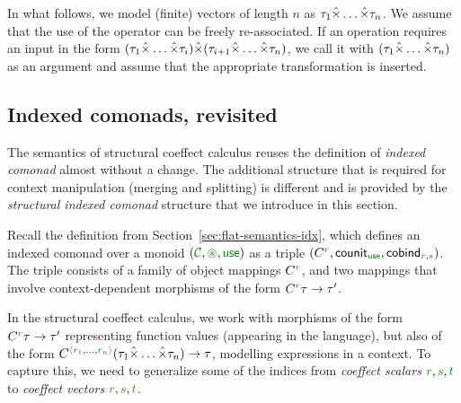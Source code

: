 In what follows, we model (finite) vectors of length $n$ as $\tau_1 \hat{\times} \ldots \hat{\times} \tau_n$.
We assume that the use of the operator can be freely re-associated. If an operation requires an 
input in the form $(\tau_1 \hat{\times} \ldots \hat{\times} \tau_i) \hat{\times} (\tau_{i+1} \hat{\times} \ldots \hat{\times} \tau_n)$,
we call it with $(\tau_1 \hat{\times} \ldots \hat{\times} \tau_n)$ as an argument and assume that the 
appropriate transformation is inserted.


\subsection{Indexed comonads, revisited}

The semantics of structural coeffect calculus reuses the definition of \emph{indexed comonad} almost
without a change. The additional structure that is required for context manipulation (merging and 
splitting) is different and is provided by the \emph{structural indexed comonad} structure that we
introduce in this section.

Recall the definition from Section~\ref{sec:flat-semantics-idx}, which defines an indexed comonad 
over a monoid $(\C, \cseq, \cunit)$ as a triple $(\ctyp{\cclrd{r}{}}, \ident{counit}_{\cunit}, 
\ident{cobind}_{\cclrd{r}, \cclrd{s}})$. The triple consists of a family of object mappings $\ctyp{\cclrd{r}{}}$,
and two mappings that involve context-dependent morphisms of the form $\ctyp{\cclrd{r}} \tau \rightarrow \tau'$.

In the structural coeffect calculus, we work with morphisms of the form $\ctyp{\cclrd{r}} \tau \rightarrow \tau'$
representing function values (appearing in the language), but also of the form
$\ctyp{\alift{\cclrd{r_1},\ldots,\cclrd{r_n}}}{(\tau_1 \xtimes \ldots \xtimes \tau_n)} \rightarrow \tau$, 
modelling expressions in a context. To capture this, we need to generalize some of the indices from
\emph{coeffect scalars} $\cclrd{r}, \cclrd{s}, \cclrd{t}$ to \emph{coeffect vectors} $\aclrd{r}, \aclrd{s}, \aclrd{t}$.

